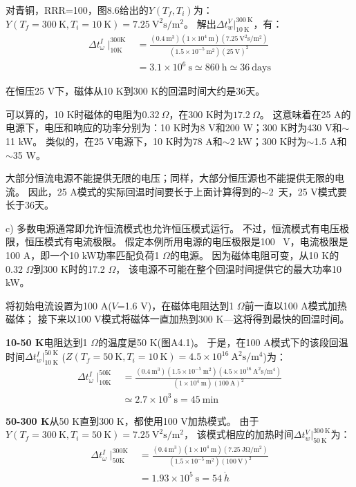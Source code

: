 对青铜，RRR=100，图8.6给出的$Y(T_f,T_i)$为：
$Y(T_f=300\ \mathrm{K},T_i=10\ \mathrm{K})=7.25\ \mathrm{V^2 s/m^2}$。
解出$\Delta t_w^V|_{10\ \mathrm{K}}^{300\ \mathrm{K}}$，有：
\begin{align*}%
\Delta t_{\omega}^{I}\mid_{10\mathrm{K}}^{300\mathrm{K}}&=\frac{(0.4\ \mathrm{m^3})(1\times 10^4\ \mathrm{m})(7.25\ \mathrm{V^2s/m^2})}{(1.5\times 10^{-5}\ \mathrm{m^2})(25\ \mathrm{V})^2} \\
&=3.1\times 10^6\ \mathrm{s}\simeq 860\ \mathrm{h}\simeq 36\ \mathrm{days} \tag{S1.4}
\end{align*}

在恒压25 V下，磁体从10 K到300 K的回温时间大约是36天。

可以算的，10 K时磁体的电阻为$0.32\ \Omega$，在300 K时为$17.2\ \Omega$。
这意味着在25 A的电源下，电压和响应的功率分别为：10 K时为8 V和200 W；300 K时为430 V和$\sim$11 kW。
类似的，在25 V电源下，10 K时为78 A和$\sim 2$ kW；300 K时为$\sim$1.5 A和$\sim$35 W。

大部分恒流电源不能提供无限的电压；同样，大部分恒压源也不能提供无限的电流。
因此，25 A模式的实际回温时间要长于上面计算得到的$\sim 2$~天，25 V模式要长于36天。

c) 多数电源通常即允许恒流模式也允许恒压模式运行。
不过，恒流模式有电压极限，恒压模式有电流极限。
假定本例所用电源的电压极限是100~ V，电流极限是100 A，即一个10 kW功率匹配负荷1 $\Omega$的电源。
因为磁体电阻可变，从10 K的0.32 $\Omega$到300 K时的17.2 $\Omega$，
该电源不可能在整个回温时间提供它的最大功率10 kW。

将初始电流设置为100 A($V$=1.6 V)，在磁体电阻达到1 $\Omega$前一直以100 A模式加热磁体；
接下来以100 V模式将磁体一直加热到300 K---这将得到最快的回温时间。

\textbf{10-50 K}\quad 电阻达到1 $\Omega$的温度是50 K(图A4.1)。
于是，在100 A模式下的该段回温时间$\Delta t_w^I|_{10\ \mathrm{K}}^{50\ \mathrm{K}}$
	($Z(T_f=50\ \mathrm{K},T_i=10\ \mathrm{K})=4.5\times 10^{16}\ \mathrm{A^2 s/m^4}$)为：
\begin{align*}%
\Delta t_{\omega}^{I}\mid_{10\mathrm{K}}^{50\mathrm{K}}&=\frac{(0.4\ \mathrm{m^3})(1.5\times 10^{-5}\ \mathrm{m^2})(4.5\times 10^{16}\ \mathrm{A^2s/m^4})}{(1\times 10^4\ \mathrm{m})(100\ \mathrm{A})^2} \\
&\simeq 2.7\times 10^3\ \mathrm{s}=45\ \mathrm{min} \tag{S1.5}
\end{align*}

\textbf{50-300 K}\quad 从50 K直到300 K，都使用100 V加热模式。
由于$Y(T_f=300\ \mathrm{K},T_i=50\ \mathrm{K})=7.25\ \mathrm{V^2 s/m^2}$，
该模式相应的加热时间$\Delta t_w^V|_{50\ \mathrm{K}}^{300\ \mathrm{K}}$为：
\begin{align*}%
\Delta t_{\omega}^{I}\mid_{50\mathrm{K}}^{300\mathrm{K}}&=\frac{(0.4\ \mathrm{m^3})(1\times 10^4\ \mathrm{m})(7.25\ \mathrm{J\Omega/m^2})}{(1.5\times 10^{-5}\ \mathrm{m^2})(100\ \mathrm{V})^2} \\
&=1.93\times 10^5\ \mathrm{s}=54\ \mathring{h} \tag{S1.6}
\end{align*}

